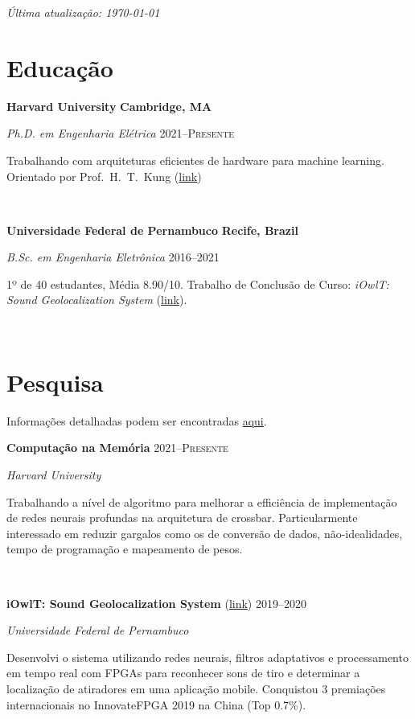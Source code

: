 \documentclass[letterpaper,10pt]{article}
\newcommand{\entry}[4]{

\begin{minipage}[t]{.15\textwidth}
\end{minipage}
\hfill\vline\hfill 
\begin{minipage}[t]{0.95\textwidth}
#2 \hfill \textsc{#1}

\textit{#3}

\footnotesize{#4}
\end{minipage}\\\vspace{.25cm}}
\newcommand{\we}[5]{

\begin{minipage}[t]{.15\textwidth}
\end{minipage}
\hfill\vline\hfill 
\begin{minipage}[t]{0.95\textwidth}
#2 \hfill \textbf{#5}

\textit{#3} \hfill \textsc{#1}

\footnotesize{#4}
\end{minipage}\\\vspace{.25cm}}
\newcommand{\harv}{Harvard University}
\newcommand{\ufpe}{Universidade Federal de Pernambuco}
\begin{document}
\par{\par}
\par{\par}
\par{\par}
\hfill \textit{Última atualização: \today}
\vspace{-.25cm}

\section{Educação}
\vspace*{.1cm}
\we{2021--Presente}{\textbf{\harv}}{Ph.D. em Engenharia Elétrica}{Trabalhando com arquiteturas eficientes de hardware para machine learning. Orientado por Prof.\ H.\ T.\ Kung (\href{https://www.eecs.harvard.edu/htk/}{link})}{Cambridge, MA}
\we{2016--2021}{\textbf{\ufpe}}{B.Sc. em Engenharia Eletrônica}{
	1º de 40 estudantes, Média 8.90/10. Trabalho de Conclusão de Curso: \textit{iOwlT: Sound Geolocalization System} (\href{https://www.matheussfarias.com/assets/files/SeniorThesis.pdf}{link}).
	}{Recife, Brazil}

\vspace*{-.25cm}
\section{Pesquisa}

Informações detalhadas podem ser encontradas \href{https://www.matheussfarias.com/}{aqui}.

\vspace{.1cm}

\entry{2021--Presente}{\textbf{Computação na Memória}}{\harv}{
	Trabalhando a nível de algoritmo para melhorar a efficiência de implementação de redes neurais profundas na arquitetura de crossbar. Particularmente interessado em reduzir gargalos como os de conversão de dados, não-idealidades, tempo de programação e mapeamento de pesos.
}

\entry{2019--2020}{\textbf{iOwlT: Sound Geolocalization System} (\href{https://www.matheussfarias.com/iowlt.html}{link})}{\ufpe}{
	Desenvolvi o sistema utilizando redes neurais, filtros adaptativos e processamento em tempo real com FPGAs para reconhecer sons de tiro e determinar a localização de atiradores em uma aplicação mobile. Conquistou 3 premiações internacionais no InnovateFPGA 2019 na China (Top 0.7\%).
}
\end{document}
